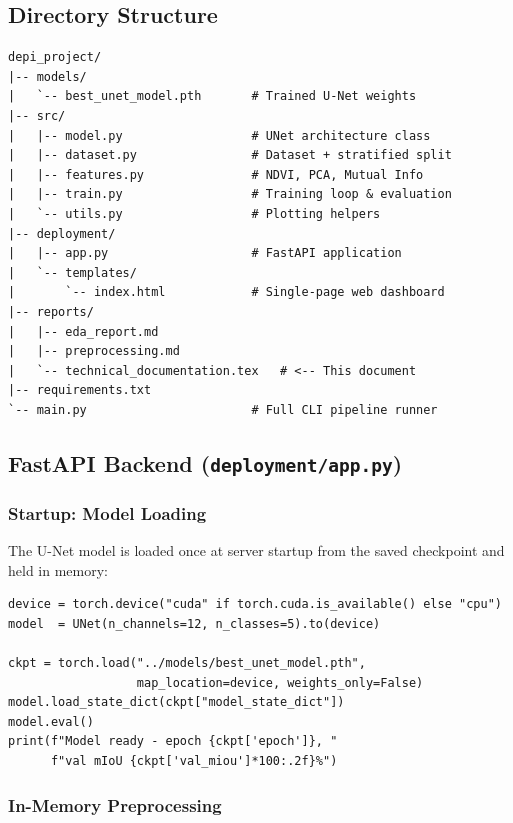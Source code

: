 \documentclass[12pt, a4paper]{article}
\begin{document}
\subsection{Directory Structure}

\begin{lstlisting}[style=bash, caption={Project layout after Milestone 4}]
depi_project/
|-- models/
|   `-- best_unet_model.pth       # Trained U-Net weights
|-- src/
|   |-- model.py                  # UNet architecture class
|   |-- dataset.py                # Dataset + stratified split
|   |-- features.py               # NDVI, PCA, Mutual Info
|   |-- train.py                  # Training loop & evaluation
|   `-- utils.py                  # Plotting helpers
|-- deployment/
|   |-- app.py                    # FastAPI application
|   `-- templates/
|       `-- index.html            # Single-page web dashboard
|-- reports/
|   |-- eda_report.md
|   |-- preprocessing.md
|   `-- technical_documentation.tex   # <-- This document
|-- requirements.txt
`-- main.py                       # Full CLI pipeline runner
\end{lstlisting}

\subsection{FastAPI Backend (\texttt{deployment/app.py})}

\subsubsection{Startup: Model Loading}

The U-Net model is loaded once at server startup from the saved checkpoint and held in memory:

\begin{lstlisting}[style=python, caption={Model initialisation at startup}]
device = torch.device("cuda" if torch.cuda.is_available() else "cpu")
model  = UNet(n_channels=12, n_classes=5).to(device)

ckpt = torch.load("../models/best_unet_model.pth",
                  map_location=device, weights_only=False)
model.load_state_dict(ckpt["model_state_dict"])
model.eval()
print(f"Model ready - epoch {ckpt['epoch']}, "
      f"val mIoU {ckpt['val_miou']*100:.2f}%")
\end{lstlisting}

\subsubsection{In-Memory Preprocessing}
\end{document}
